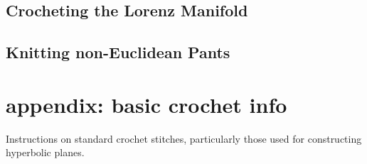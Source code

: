 \documentclass[letterpaper,titlepage]{article}
\begin{document}
\subsection{Crocheting the Lorenz Manifold \cite{crochetlorenz}}
\subsection{Knitting non-Euclidean Pants \cite{makingmath}}

\section*{appendix: basic crochet info}
Instructions on standard crochet stitches, particularly those used for constructing hyperbolic planes. \cite{happyhooker}

\newpage


\end{document}
